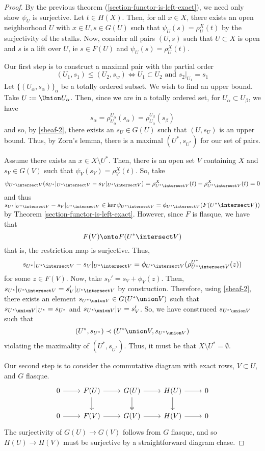 \documentclass[11pt,leqno,oneside]{amsbook}
\renewcommand{\F}{F} %
\newcommand{\G}{G}
\renewcommand{\H}{H}
\numberwithin{thm}{section}
\begin{document}
\begin{proof}
  By the previous theorem (\ref{section-functor-is-left-exact}), we
  need only show \(\psi_U\) is 
  surjective. Let \(t \in \H(X)\). Then, for all \(x \in X\), there
  exists an open 
  neighborhood \(U\) with \(x
  \in U, s \in \G(U)\) such that \(\psi_U(s) = \rho^X_U(t)\) by the
  surjectivity of the stalks. Now, consider all pairs \((U,s)\) such
  that \(U \subset X\) is open and \(s\) is a lift over \(U\), ie \(s
  \in \F(U)\) and \(\psi_U(s) = \rho^X_U(t)\).

  Our first step is to construct a maximal pair with the partial
  order \[
    (U_1,s_1) \leq (U_2,s_w) \iff U_1 \subset U_2 \text{ and
    }s_2|_{U_1} = s_1
  \]
  Let \(\{(U_\alpha,s_\alpha)\}_\alpha\) be a totally ordered
  subset. We wish to find an upper bound. Take \(U := \Union
  U_\alpha\). Then, since we are in a totally ordered set, for
  \(U_\alpha \subset U_\beta\), we have \[
    s_\alpha = \rho^{U_\alpha}_{U_\alpha}(s_\alpha) =
    \rho^{U_\beta}_{U_\alpha}(s_\beta)
  \]
  and so, by \ref{sheaf-2}, there exists an \(s_U \in \G(U)\) such
  that \((U,s_U)\) is an upper bound. Thus, by Zorn's lemma, there is
  a maximal \((U^*,s_{U^*})\) for our set of pairs.

  Assume there exists an \(x \in X \setminus U^*\). Then, there is an
  open set \(V\) containing \(X\) and \(s_V \in \G(V)\) such that
  \(\psi_V(s_V) = \rho^X_V(t)\). So, take \[
    \psi_{U^* \intersect V}(s_{U^*}|_{U^* \intersect V} - s_{V}|_{U^*
      \intersect V}) = \rho^X_{U^* \intersect V}(t) - \rho^X_{U^*
      \intersect V}(t) = 0
  \]
  and thus \(s_{U^*}|_{U^* \intersect V} - s_{V}|_{U^* \intersect V}
  \in \ker \psi_{U^* \intersect V} = \phi_{U^* \intersect V}(\F(U^*
  \intersect V))\) by Theorem
  \ref{section-functor-is-left-exact}. However, since \(\F\) is
  flasque, we have that \[
    \F(V) \onto \F(U^* \intersect V)
  \]
  that is, the restriction map is surjective. Thus, \[
    s_{U^*}|_{U^* \intersect V} - s_V|_{U^* \intersect V} = \phi_{U^*
      \intersect V}(\rho^{U^*}_{U^* \intersect V}(z))
  \]
  for some \(z \in \F(V)\). Now, take \(s_V' = s_V+\phi_V(z)\). Then,
  \(s_{U^*}|_{U^* \intersect V} = s_V'|_{U^* \intersect V}\) by
  construction. Therefore, using \ref{sheaf-2}, there exists an
  element \(s_{U^* \union V} \in \G(U^* \union V)\) such that \(s_{U^*
    \union V}|_{U^*} = s_{U^*}\) and \(s_{U^* \union V}|_V =
  s_V'\). So, we have construced \(s_{U^* \union V}\) such that \[
    (U^*, s_{U^*}) \prec (U^* \union V,s_{U^* \union V})
  \]
  violating the maximality of \((U^*,s_{U^*})\). Thus, it must be that
  \(X \setminus U^* = \emptyset\).

  Our second step is to consider the commutative diagram with exact
  rows, \(V \subset U\), and \(\G\) flasque. \[
  \begin{tikzcd}
    0 \ar[r] & \F(U) \ar[d] \ar[r] & \G(U) \ar[d, two heads] \ar[r] & \H(U)
    \ar[d] \ar[r] & 0\\
    0 \ar[r] & \F(V) \ar[r] & \G(V) \ar[r] & \H(V) \ar[r] & 0
  \end{tikzcd}
\]
The surjectivity of \(\G(U) \to \G(V)\) follows from \(\G\) flasque,
and so \(\H(U) \to \H(V)\) must be surjective by a straightforward
diagram chase. 
\end{proof}
\end{document}
